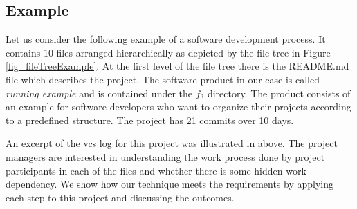 \subsection{Example}
\label{subsec:scenario}

Let us consider the following example of a software development process. It contains $10$ files arranged hierarchically as depicted by the file tree in Figure \ref{fig_fileTreeExample}. At the first level of the file tree there is the README.md file which describes the project. The software product in our case is called \emph{running example} and is contained under the $f_3$ directory. The product consists of an example for software developers who want to organize their projects according to a predefined structure. The project has 21 commits over 10 days.



An excerpt of the \gls{vcs} log for this project was illustrated in  above. The project managers are interested in understanding the work process done by project participants in each of the files and whether there is some hidden work dependency. We show how our technique meets the requirements by applying each step to this project and discussing the outcomes.

